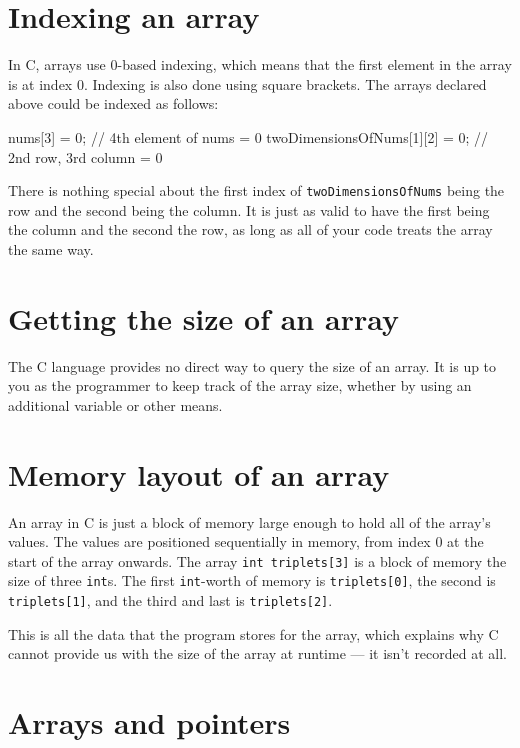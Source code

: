 \section{Indexing an array}

In C, arrays use 0-based indexing, which means that the first element in the array is at index 0.
Indexing is also done using square brackets.
The arrays declared above could be indexed as follows:

\begin{codeblock}
nums[3] = 0; // 4th element of nums = 0
twoDimensionsOfNums[1][2] = 0; // 2nd row, 3rd column = 0
\end{codeblock}

There is nothing special about the first index of \lstinline!twoDimensionsOfNums! being the row and the second being the column.
It is just as valid to have the first being the column and the second the row, as long as all of your code treats the array the same way.

\section{Getting the size of an array}

The C language provides no direct way to query the size of an array.
It is up to you as the programmer to keep track of the array size, whether by using an additional variable or other means.

\section{Memory layout of an array}

An array in C is just a block of memory large enough to hold all of the array's values.
The values are positioned sequentially in memory, from index 0 at the start of the array onwards.
The array \lstinline!int triplets[3]! is a block of memory the size of three \lstinline!int!s.
The first \lstinline!int!-worth of memory is \lstinline!triplets[0]!, the second is \lstinline!triplets[1]!, and the third and last is \lstinline!triplets[2]!.

This is all the data that the program stores for the array, which explains why C cannot provide us with the size of the array at runtime --- it isn't recorded at all.

\section{Arrays and pointers}

